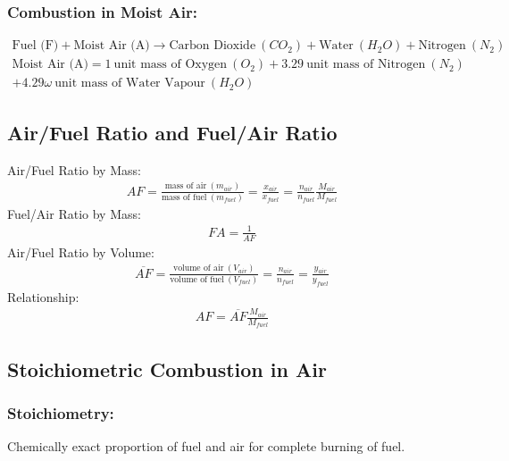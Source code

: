 \documentclass[class=report, crop=false, 12pt,a4paper]{standalone}
\numberwithin{equation}{section}
\begin{document}
\subsubsection{Combustion in Moist Air:}
\begin{gather*}
  \text{Fuel (F)} + \text{Moist Air (A)} \longrightarrow \text{Carbon Dioxide} \ (CO_2) + \text{Water} \ (H_2O) + \text{Nitrogen} \ (N_2) \\[5pt]
  \text{Moist Air (A)} = 1 \ \text{unit mass of Oxygen} \ (O_2) + 3.29 \ \text{unit mass of Nitrogen} \ (N_2) \\ 
  + 4.29\omega \ \text{unit mass of Water Vapour} \ (H_2O)
\end{gather*}
\subsection{Air/Fuel Ratio and Fuel/Air Ratio}
Air/Fuel Ratio by Mass:
\begin{gather}
  AF = \frac{\text{mass of air}\ (m_{air})}{\text{mass of fuel}\ (m_{fuel})} = \frac{x_{air}}{x_{fuel}} = \frac{n_{air}}{n_{fuel}}\frac{M_{air}}{M_{fuel}}
\end{gather}
Fuel/Air Ratio by Mass:
\begin{gather}
  FA = \frac{1}{AF}
\end{gather}
Air/Fuel Ratio by Volume:
\begin{gather}
  \overline{AF} = \frac{\text{volume of air}\ (V_{air})}{\text{volume of fuel}\ (V_{fuel})} = \frac{n_{air}}{n_{fuel}} = \frac{y_{air}}{y_{fuel}}
\end{gather}
Relationship:
\begin{gather}
  AF = \overline{AF}\frac{M_{air}}{M_{fuel}}
\end{gather}
\subsection{Stoichiometric Combustion in Air}
\subsubsection{Stoichiometry:}
Chemically exact proportion of fuel and air for complete burning of fuel.
\end{document}
